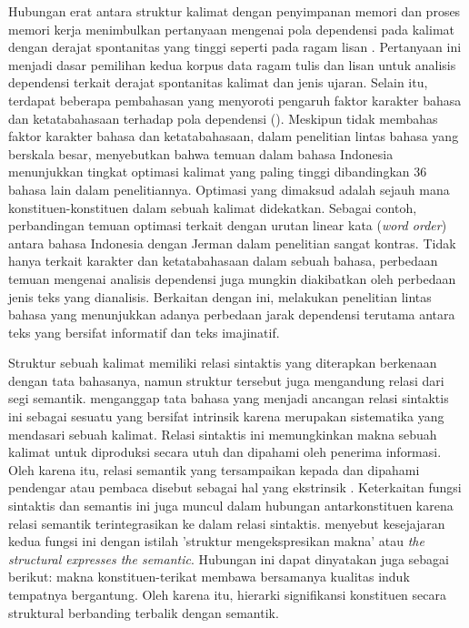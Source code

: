 Hubungan erat antara struktur kalimat dengan penyimpanan memori dan proses memori kerja menimbulkan pertanyaan mengenai pola dependensi pada kalimat dengan derajat spontanitas yang tinggi seperti pada ragam lisan \citep{abney1991memory}. Pertanyaan ini menjadi dasar pemilihan kedua korpus data ragam tulis dan lisan untuk analisis dependensi terkait derajat spontanitas kalimat dan jenis ujaran. Selain itu, terdapat beberapa pembahasan yang menyoroti pengaruh faktor karakter bahasa dan ketatabahasaan terhadap pola dependensi (\citealp{hawkins2014cross, jiang2015effects, wang2017effects}). Meskipun tidak membahas faktor karakter bahasa dan ketatabahasaan, dalam penelitian lintas bahasa yang berskala besar, \cite{futrell2015large} menyebutkan bahwa temuan dalam bahasa Indonesia menunjukkan tingkat optimasi kalimat yang paling tinggi dibandingkan 36 bahasa lain dalam penelitiannya. Optimasi yang dimaksud adalah sejauh mana konstituen-konstituen dalam sebuah kalimat didekatkan. Sebagai contoh, perbandingan temuan optimasi terkait dengan urutan linear kata (\textit{word order}) antara bahasa Indonesia dengan Jerman dalam penelitian \cite{futrell2015large} sangat kontras. Tidak hanya terkait karakter dan ketatabahasaan dalam sebuah bahasa, perbedaan temuan mengenai analisis dependensi juga mungkin diakibatkan oleh perbedaan jenis teks yang dianalisis. Berkaitan dengan ini, \cite{wang2017effects} melakukan penelitian lintas bahasa yang menunjukkan adanya perbedaan jarak dependensi terutama antara teks yang bersifat informatif dan teks imajinatif.

Struktur sebuah kalimat memiliki relasi sintaktis yang diterapkan berkenaan dengan tata bahasanya, namun struktur tersebut juga mengandung relasi dari segi semantik. \cite{tesniere1959elements} menganggap tata bahasa yang menjadi ancangan relasi sintaktis ini sebagai sesuatu yang bersifat intrinsik karena merupakan sistematika yang mendasari sebuah kalimat. Relasi sintaktis ini memungkinkan makna sebuah kalimat untuk diproduksi secara utuh dan dipahami oleh penerima informasi. Oleh karena itu, relasi semantik yang tersampaikan kepada dan dipahami pendengar atau pembaca disebut sebagai hal yang ekstrinsik \citep{tesniere1959elements}. Keterkaitan fungsi sintaktis dan semantis ini juga muncul dalam hubungan antarkonstituen karena relasi semantik terintegrasikan ke dalam relasi sintaktis. \cite{tesniere1959elements} menyebut kesejajaran kedua fungsi ini dengan istilah 'struktur mengekspresikan makna' atau \textit{the structural expresses the semantic}. Hubungan ini dapat dinyatakan juga sebagai berikut: makna \gls{konstituen-terikat} membawa bersamanya kualitas induk tempatnya bergantung. Oleh karena itu, hierarki signifikansi konstituen secara struktural berbanding terbalik dengan semantik.


